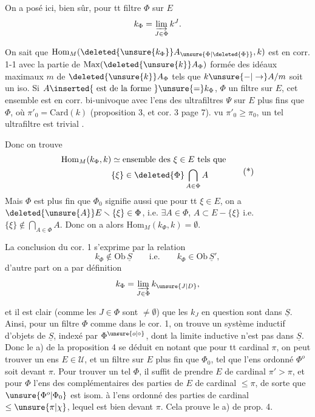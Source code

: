 On a posé ici, bien sûr, pour tt filtre $\Phi$ sur $E$
\[
 k_{\Phi}=\varinjlim_{J\in\Phi}k^J .
\]

On sait que 
$\mathrm{Hom}_M(\deleted{\unsure{k_{\Phi}}}A_{\unsure{\Phi|\deleted{\Phi}}},k)$ est en
corr. 1-1 avec la partie de $\mathrm{Max}(\deleted{\unsure{k}}A_{\Phi})$
formée des idéaux maximaux $m$ de $\deleted{\unsure{k}}A_{\Phi}$
tels que  $k\unsure{-|\to}A/m$ soit un iso.
Si $A\inserted{\text{ est de la forme }}\unsure{=}k_{\Phi}$, $\Phi$ un filtre
sur $E$, cet ensemble est en corr. bi-univoque avec l'ens des
ultrafiltres $\Psi$ sur $E$ plus fins que $\Phi$,
où $\pi'_0=\mathrm{Card}(k)$ (proposition 3, et cor. 3
 page 7).  vu
$\pi'_0\geq\pi_0$, un tel ultrafiltre est trivial
.

Donc on trouve
\[
\begin{aligned}
\mathrm{Hom}_M(k_{\Phi},k)&\simeq\text{ensemble des }\xi\in E\text{ tels que}\\
&\{\xi\}\in\deleted{\Phi}\bigcap_{A\in\Phi}A
\end{aligned}\tag*{(*)}
\]
Mais   $\Phi$ est plus fin que
$\Phi_0$ signifie aussi que pour tt $\xi\in E$, on a
$\deleted{\unsure{A}}E\smallsetminus\{\xi\}\in\Phi$, i.e.
$\exists A\in\Phi$,  $A\subset E-\{\xi\}$ i.e.
 $\{\xi\}\notin\bigcap_{A\in\Phi}A$.
Donc on a alors $\mathrm{Hom}_M(k_{\Phi},k)=\emptyset$.

 La conclusion du cor. 1 s'exprime
par la relation
\[
 k_{\Phi}\notin\mathrm{Ob}\,\underline S\qquad\text{i.e.}\qquad
 k_{\Phi}\in\mathrm{Ob}\,\underline S',
\]
d'autre part on a par définition
\[
 k_{\Phi}=\varinjlim_{J\in\Phi}k_{\unsure{J|D}},
\]

et  il est clair (comme les $J\in\Phi$ sont
$\ne\emptyset$) que  les $k_J$ en question sont dans
$\underline S$. Ainsi, pour un filtre $\Phi$ comme dans le cor. 1,
on trouve un système inductif d'objets de $\underline S$, indexé
par $\Phi^{\unsure{o|\circ}}$, dont la limite inductive n'est pas dans
$\underline S$. Donc le a) de la proposition 4 se déduit en notant
que pour tt cardinal $\pi$, on peut trouver
un ens $E\in\mathcal U$, et un filtre \inserted{$\Phi$} sur $E$ plus
fin que $\Phi_0$, tel que l'ens ordonné $\Phi^o$ soit 
devant $\pi$. Pour trouver un tel $\Phi$, il suffit de prendre $E$ de
cardinal $\pi'>\pi$, et pour $\Phi$ l'ens des complémentaires des
parties de $E$ de cardinal $\leq\pi$, de sorte que
$\unsure{\Phi^o|\Phi_0}$ est isom. à l'ens ordonné des
 parties  de cardinal
$\leq\unsure{\pi|\chi}$, lequel est bien  devant $\pi$.
Cela prouve  le a) de prop. 4.

